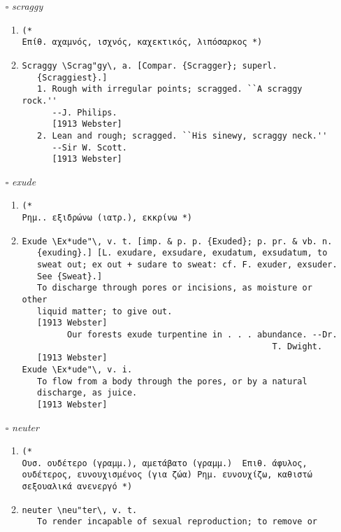 \documentclass{article}
\begin{document}
\begin{itemize}
\item[$\square$] \emph{ scraggy }
\begin{enumerate}
\item{
\begin{lstlisting}
(* 
Επίθ. αχαμνός, ισχνός, καχεκτικός, λιπόσαρκος *)
\end{lstlisting}}
\item{
\begin{lstlisting}
Scraggy \Scrag"gy\, a. [Compar. {Scragger}; superl.
   {Scraggiest}.]
   1. Rough with irregular points; scragged. ``A scraggy rock.''
      --J. Philips.
      [1913 Webster]
   2. Lean and rough; scragged. ``His sinewy, scraggy neck.''
      --Sir W. Scott.
      [1913 Webster]
\end{lstlisting}}
\end{enumerate}
\item[$\square$] \emph{ exude }
\begin{enumerate}
\item{
\begin{lstlisting}
(* 
Ρημ.. εξιδρώνω (ιατρ.), εκκρίνω *)
\end{lstlisting}}
\item{
\begin{lstlisting}
Exude \Ex*ude"\, v. t. [imp. & p. p. {Exuded}; p. pr. & vb. n.
   {exuding}.] [L. exudare, exsudare, exudatum, exsudatum, to
   sweat out; ex out + sudare to sweat: cf. F. exuder, exsuder.
   See {Sweat}.]
   To discharge through pores or incisions, as moisture or other
   liquid matter; to give out.
   [1913 Webster]
         Our forests exude turpentine in . . . abundance. --Dr.
                                                  T. Dwight.
   [1913 Webster]
Exude \Ex*ude"\, v. i.
   To flow from a body through the pores, or by a natural
   discharge, as juice.
   [1913 Webster]
\end{lstlisting}}
\end{enumerate}
\item[$\square$] \emph{ neuter }
\begin{enumerate}
\item{
\begin{lstlisting}
(* 
Ουσ. ουδέτερο (γραμμ.), αμετάβατο (γραμμ.)  Επιθ. άφυλος, ουδέτερος, ευνουχισμένος (για ζώα) Ρημ. ευνουχίζω, καθιστώ σεξουαλικά ανενεργό *)
\end{lstlisting}}
\item{
\begin{lstlisting}
neuter \neu"ter\, v. t.
   To render incapable of sexual reproduction; to remove or

\end{lstlisting}}
\end{enumerate}
\end{itemize}
\end{document}
